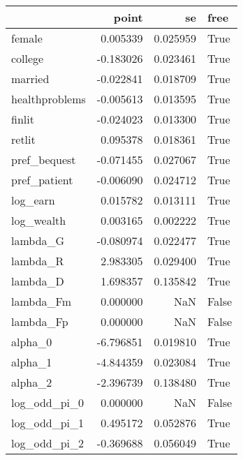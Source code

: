 \begin{tabular}{lrrl}
\toprule
{} &     point &        se &   free \\
\midrule
female         &  0.005339 &  0.025959 &   True \\
college        & -0.183026 &  0.023461 &   True \\
married        & -0.022841 &  0.018709 &   True \\
healthproblems & -0.005613 &  0.013595 &   True \\
finlit         & -0.024023 &  0.013300 &   True \\
retlit         &  0.095378 &  0.018361 &   True \\
pref\_bequest   & -0.071455 &  0.027067 &   True \\
pref\_patient   & -0.006090 &  0.024712 &   True \\
log\_earn       &  0.015782 &  0.013111 &   True \\
log\_wealth     &  0.003165 &  0.002222 &   True \\
lambda\_G       & -0.080974 &  0.022477 &   True \\
lambda\_R       &  2.983305 &  0.029400 &   True \\
lambda\_D       &  1.698357 &  0.135842 &   True \\
lambda\_Fm      &  0.000000 &       NaN &  False \\
lambda\_Fp      &  0.000000 &       NaN &  False \\
alpha\_0        & -6.796851 &  0.019810 &   True \\
alpha\_1        & -4.844359 &  0.023084 &   True \\
alpha\_2        & -2.396739 &  0.138480 &   True \\
log\_odd\_pi\_0   &  0.000000 &       NaN &  False \\
log\_odd\_pi\_1   &  0.495172 &  0.052876 &   True \\
log\_odd\_pi\_2   & -0.369688 &  0.056049 &   True \\
\bottomrule
\end{tabular}
